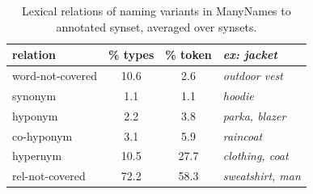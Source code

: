 %
\begin{table}[t]
\small
\centering
\setlength{\tabcolsep}{2pt}
\begin{tabular}{lcc|p{2.5cm}}
\toprule
         relation & \% types & \% token & \it ex: jacket \\
\midrule
 word-not-covered &  10.6 &  2.6 & \it outdoor vest\\
\midrule
 synonym &  1.1 &  1.1 & \it hoodie  \\
 hyponym &  2.2 &  3.8 & \it parka, blazer \\
 co-hyponym &  3.1 &  5.9 & \it raincoat\\
 hypernym &  10.5 &  27.7 & \it clothing, coat\\
 rel-not-covered &  72.2 &  58.3 & \it sweatshirt, man\\
\bottomrule
\end{tabular}
\caption{Lexical relations of naming variants in ManyNames to annotated \vg synset, averaged over synsets.}
\label{tab:rel}
\vspace{-0.5cm}
\end{table}

